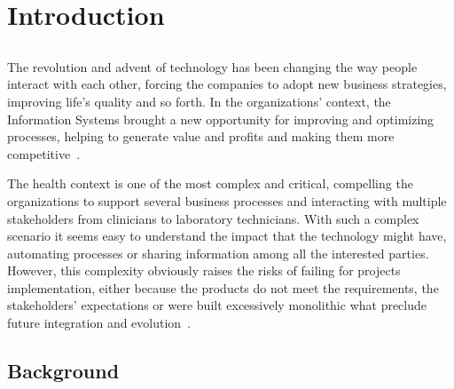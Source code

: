 \chapter{Introduction} \label{chap:intro}

\section*{}




The revolution and advent of technology has been changing the way people interact with each other, forcing the companies to adopt new business strategies, improving life's quality and so forth. In the organizations' context, the Information Systems brought a new opportunity for improving and optimizing processes, helping to generate value and profits and making them more competitive~\citep{Gurbaxani1991}.

The health context is one of the most complex and critical, compelling the organizations to support several business processes and interacting with multiple stakeholders from clinicians to laboratory technicians. With such a complex scenario it seems easy to understand the impact that the technology might have, automating processes or sharing information among all the interested parties. However, this complexity obviously raises the risks of failing for projects implementation, either because the products do not meet the requirements, the stakeholders' expectations or were built excessively monolithic what preclude future integration and evolution~\citep{Chu2006}.

\section{Background} \label{sec:background}

